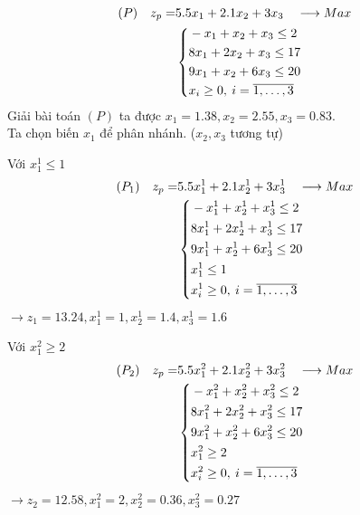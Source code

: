 \documentclass[12pt,a4paper]{report}
\begin{document}
    \begin{equation*}
    \begin{split}
    (P) \quad z_p= & 5.5x_1 + 2.1x_2 + 3x_3 \quad \longrightarrow Max \\
    & \left\{\begin{split}
    & -x_1 + x_2 + x_3 \leq 2 \\
    & 8x_1 + 2x_2 + x_3\leq 17 \\
    & 9x_1 + x_2 + 6x_3 \leq 20 \\
    &x_i \geq 0 , \: i=\overline{\rm 1, \ldots ,3} \\
    \end{split}\right. \\
    \end{split}
    \end{equation*}
    Giải bài toán $(P)$ ta được $x_1=1.38, x_2=2.55, x_3=0.83$. \\
    Ta chọn biến $x_1$ để phân nhánh. ($x_2, x_3$ tương tự)
    
    
    
    Với $x^1_1 \leq 1$ \\ 
    \begin{equation*}
    \begin{split}
      (P_1) \quad z_p= & 5.5x^1_1 + 2.1x^1_2 + 3x^1_3 \quad \longrightarrow Max \\
      & \left\{\begin{split}
      & -x^1_1 + x^1_2 + x^1_3 \leq 2 \\
      & 8x^1_1 + 2x^1_2 + x^1_3\leq 17 \\
      & 9x^1_1 + x^1_2 + 6x^1_3 \leq 20 \\
      & x^1_1 \leq 1 \\
      &x^1_i \geq 0 , \: i=\overline{\rm 1, \ldots ,3} \\
      \end{split}\right. \\
    \end{split}
    \end{equation*}
    $\rightarrow z_1=13.24, x^1_1=1, x^1_2=1.4, x^1_3=1.6$
    
    
    
    Với $x^2_1 \geq 2$ \\
    \begin{equation*}
      \begin{split}
        (P_2) \quad z_p= & 5.5x^2_1 + 2.1x^2_2 + 3x^2_3 \quad \longrightarrow Max \\
        & \left\{\begin{split}
        & -x^2_1 + x^2_2 + x^2_3 \leq 2 \\
        & 8x^2_1 + 2x^2_2 + x^2_3\leq 17 \\
        & 9x^2_1 + x^2_2 + 6x^2_3 \leq 20 \\
        & x^2_1 \geq 2 \\
        &x^2_i \geq 0 , \: i=\overline{\rm 1, \ldots ,3} \\
        \end{split}\right. \\
    \end{split}
    \end{equation*}
    $\rightarrow z_2=12.58, x^2_1=2, x^2_2=0.36, x^2_3=0.27$
    
\end{document}
